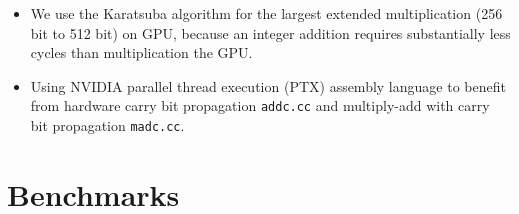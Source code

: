 \documentclass[oribibl,a4paper]{llncs2e/llncs}
\begin{document}
\begin{itemize}
\item We use the Karatsuba algorithm \cite{Karatsuba1963} for the largest extended multiplication (256 bit to 512 bit) on GPU, because an integer addition requires substantially less cycles than multiplication the GPU.
\item Using NVIDIA parallel thread execution (PTX) assembly language to benefit from hardware carry bit propagation \verb|addc.cc| and multiply-add with carry bit propagation \verb|madc.cc|.
\end{itemize}

\section{Benchmarks}
\end{document}
